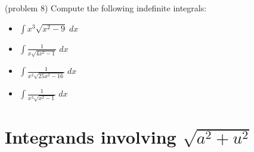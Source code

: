 \documentclass{ximera}
\begin{document}
\begin{problem}(problem 8)
Compute the following indefinite integrals:
\begin{itemize}
\item $\displaystyle{\int   x^3 \sqrt{x^2 - 9} \; dx}$
\item $\displaystyle{\int \frac{1}{x\sqrt{4x^2 - 1}}\; dx}$
\item $\displaystyle{\int \frac{1}{x^2\sqrt{25x^2-16}} \; dx}$
\item $\displaystyle{\int \frac{1}{x^3\sqrt{x^2-1}} \; dx}$
\end{itemize}

\end{problem}





\section{Integrands involving $\sqrt{a^2 + u^2}$}
\end{document}
